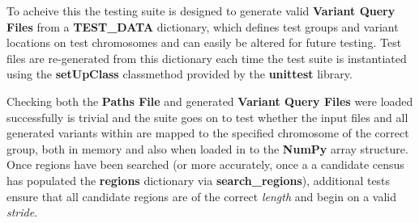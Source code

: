 To acheive this the testing suite is designed to generate valid
\textbf{Variant Query Files} from a \textbf{TEST\_DATA} dictionary, which
defines test groups and variant locations on test chromosomes and can easily be
altered for future testing. Test files are re-generated from this dictionary
each time the test suite is instantiated using the \textbf{setUpClass}
classmethod provided by the \textbf{unittest} library.

Checking both the \textbf{Paths File} and generated \textbf{Variant Query Files}
were loaded successfully is trivial and the suite goes on to test whether the
input files and all generated variants within are mapped to the specified
chromosome of the correct group, both in memory and also when loaded in to the
\textbf{NumPy} array structure. Once regions have been searched (or more
accurately, once a a candidate census has populated the \textbf{regions}
dictionary via \textbf{search\_regions}), additional tests ensure that all
candidate regions are of the correct \textit{length} and begin on a valid
\textit{stride}.

